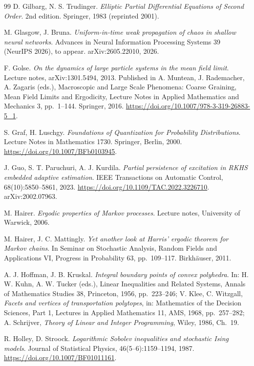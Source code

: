 \begin{thebibliography}{99}
D. Gilbarg, N. S. Trudinger.
\emph{Elliptic Partial Differential Equations of Second Order}.
2nd edition. Springer, 1983 (reprinted 2001).

M. Glasgow, J. Bruna.
\emph{Uniform-in-time weak propagation of chaos in shallow neural networks}.
Advances in Neural Information Processing Systems 39 (NeurIPS 2026), to appear. arXiv:2605.22010, 2026.

F. Golse.
\emph{On the dynamics of large particle systems in the mean field limit}.
Lecture notes, arXiv:1301.5494, 2013.
Published in A. Muntean, J. Rademacher, A. Zagaris (eds.), Macroscopic and Large Scale Phenomena: Coarse Graining,
Mean Field Limits and Ergodicity, Lecture Notes in Applied Mathematics and Mechanics 3, pp.~1--144. Springer,
2016. \url{https://doi.org/10.1007/978-3-319-26883-5_1}.

S. Graf, H. Luschgy.
\emph{Foundations of Quantization for Probability Distributions}.
Lecture Notes in Mathematics 1730. Springer, Berlin, 2000.
\url{https://doi.org/10.1007/BFb0103945}.

J. Guo, S. T. Paruchuri, A. J. Kurdila.
\emph{Partial persistence of excitation in RKHS embedded adaptive estimation}.
IEEE Transactions on Automatic Control, 68(10):5850--5861, 2023.
\url{https://doi.org/10.1109/TAC.2022.3226710}.
arXiv:2002.07963.

M. Hairer.
\emph{Ergodic properties of Markov processes}.
Lecture notes, University of Warwick, 2006.

M. Hairer, J. C. Mattingly.
\emph{Yet another look at Harris' ergodic theorem for Markov chains}.
In Seminar on Stochastic Analysis, Random Fields and Applications VI, Progress in Probability 63, pp.~109--117.
Birkh\"auser, 2011.

A. J. Hoffman, J. B. Kruskal.
\emph{Integral boundary points of convex polyhedra}.
In: H. W. Kuhn, A. W. Tucker (eds.), Linear Inequalities and Related Systems, Annals of Mathematics Studies 38,
Princeton, 1956, pp.~223--246;
V. Klee, C. Witzgall, \emph{Facets and vertices of transportation polytopes}, in: Mathematics of the Decision
Sciences, Part 1, Lectures in Applied Mathematics 11, AMS, 1968, pp.~257--282;
A. Schrijver, \emph{Theory of Linear and Integer Programming}, Wiley, 1986, Ch.~19.

R. Holley, D. Stroock.
\emph{Logarithmic Sobolev inequalities and stochastic Ising models}.
Journal of Statistical Physics, 46(5--6):1159--1194, 1987.
\url{https://doi.org/10.1007/BF01011161}.


\end{thebibliography}
